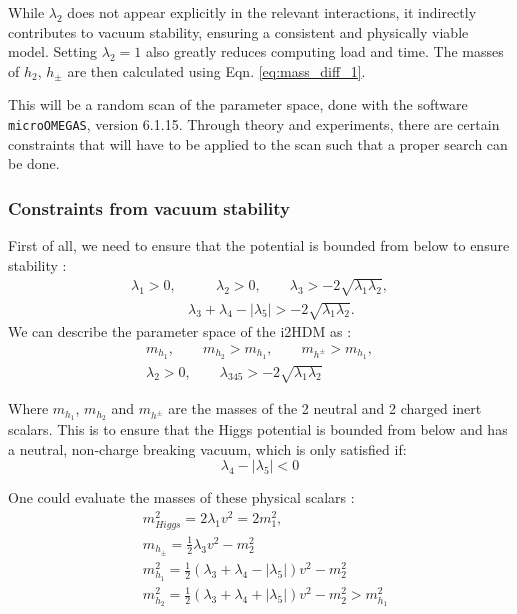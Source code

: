 \documentclass[12pt]{article}
\begin{document}
While $\lambda_2$ does not appear explicitly in the relevant interactions, it indirectly contributes to vacuum stability, ensuring a consistent and physically viable model. Setting $\lambda_2 = 1$ also greatly reduces computing load and time. The masses of $h_2$, $h_\pm$ are then calculated using Eqn. \ref{eq:mass_diff_1}.

This will be a random scan of the parameter space, done with the software \verb|microOMEGAS|, version 6.1.15. Through theory and experiments, there are certain constraints that will have to be applied to the scan such that a proper search can be done.

\subsubsection{Constraints from vacuum stability}
First of all, we need to ensure that the potential is bounded from below to ensure stability \cite{Deshpande:1977rw}:
\begin{equation}
    \begin{split}
    \lambda_1>0,& \qquad
    \lambda_2>0, \qquad
    \lambda_3> -2 \sqrt{ \lambda_1 \lambda_2}, \\
    &\lambda_3 + \lambda_4 - |\lambda_5| > -2 \sqrt{ \lambda_1 \lambda_2}.
    \end{split}
    \label{eq:potential_stability}
\end{equation}
We can describe the parameter space of the i2HDM as \cite{Belyaev:2016lok}:
\begin{equation}
    \begin{split}
        m_{h_1}, \qquad m_{h_2} > m_{h_1}, \qquad m_{h^\pm} > m_{h_1}, \\
        \lambda_2 > 0, \qquad \lambda_{345} > -2\sqrt{\lambda_1 \lambda_2}
    \end{split}
\end{equation}

Where $m_{h_1}$, $m_{h_2}$ and $m_{h^\pm}$ are the masses of the 2 neutral and 2 charged inert scalars. This is to ensure that the Higgs potential is bounded from below and has a neutral, non-charge breaking vacuum, which is only satisfied if:
\begin{equation}
    \lambda_4 - |\lambda_5| < 0
\end{equation}

One could evaluate the masses of these physical scalars \cite{Belyaev:2016lok}:
\begin{align}
    \label{eqn:scalar_equations}
    &m_{Higgs}^2 = 2\lambda_1v^2 = 2m^2_1,\\
    &m_{h_\pm} = \frac{1}{2}\lambda_3v^2-m^2_2 \\
    \label{eqn:massdmscalar}
    &m_{h_1}^2 = \frac{1}{2}(\lambda_3 + \lambda_4 - |\lambda_5|)v^2 - m_2^2\\
    &m_{h_2}^2 = \frac{1}{2}(\lambda_3 + \lambda_4 + |\lambda_5|)v^2 - m_2^2 > m^2_{h_1}
\end{align}
\end{document}
